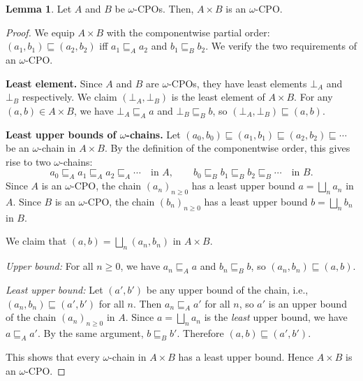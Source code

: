 \documentclass[11pt]{article}
\theoremstyle{definition}
\newtheorem{myLemma}[thm]{Lemma}{\bfseries}{}
\begin{document}
\begin{myLemma}
	Let $A$ and $B$ be $\omega$-CPOs. Then, $A \times B$ is an $\omega$-CPO.
\end{myLemma}
\begin{proof}
	We equip $A \times B$ with the componentwise partial order: $(a_1, b_1) \sqsubseteq (a_2, b_2)$ iff $a_1 \sqsubseteq_A a_2$ and $b_1 \sqsubseteq_B b_2$. We verify the two requirements of an $\omega$-CPO.

	\textbf{Least element.} Since $A$ and $B$ are $\omega$-CPOs, they have least elements $\bot_A$ and $\bot_B$ respectively. We claim $(\bot_A, \bot_B)$ is the least element of $A \times B$. For any $(a, b) \in A \times B$, we have $\bot_A \sqsubseteq_A a$ and $\bot_B \sqsubseteq_B b$, so $(\bot_A, \bot_B) \sqsubseteq (a, b)$.

	\textbf{Least upper bounds of $\omega$-chains.} Let $(a_0, b_0) \sqsubseteq (a_1, b_1) \sqsubseteq (a_2, b_2) \sqsubseteq \cdots$ be an $\omega$-chain in $A \times B$. By the definition of the componentwise order, this gives rise to two $\omega$-chains:
	\[
		a_0 \sqsubseteq_A a_1 \sqsubseteq_A a_2 \sqsubseteq_A \cdots \quad \text{in } A, \qquad b_0 \sqsubseteq_B b_1 \sqsubseteq_B b_2 \sqsubseteq_B \cdots \quad \text{in } B.
	\]
	Since $A$ is an $\omega$-CPO, the chain $(a_n)_{n \geq 0}$ has a least upper bound $a = \bigsqcup_n a_n$ in $A$. Since $B$ is an $\omega$-CPO, the chain $(b_n)_{n \geq 0}$ has a least upper bound $b = \bigsqcup_n b_n$ in $B$.

	We claim that $(a, b) = \bigsqcup_n (a_n, b_n)$ in $A \times B$.

	\emph{Upper bound:} For all $n \geq 0$, we have $a_n \sqsubseteq_A a$ and $b_n \sqsubseteq_B b$, so $(a_n, b_n) \sqsubseteq (a, b)$.

	\emph{Least upper bound:} Let $(a', b')$ be any upper bound of the chain, i.e., $(a_n, b_n) \sqsubseteq (a', b')$ for all $n$. Then $a_n \sqsubseteq_A a'$ for all $n$, so $a'$ is an upper bound of the chain $(a_n)_{n \geq 0}$ in $A$. Since $a = \bigsqcup_n a_n$ is the \emph{least} upper bound, we have $a \sqsubseteq_A a'$. By the same argument, $b \sqsubseteq_B b'$. Therefore $(a, b) \sqsubseteq (a', b')$.

	This shows that every $\omega$-chain in $A \times B$ has a least upper bound. Hence $A \times B$ is an $\omega$-CPO.
\end{proof}
\end{document}
